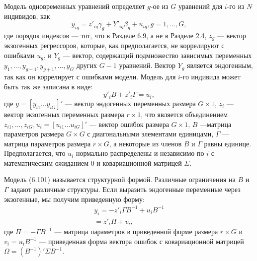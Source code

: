 Модель одновременных уравнений определяет $g$-ое из $G$ уравнений для $i$-го из $N$ индивидов, как
\begin{equation}
y_{ig}=z'_{ig} \gamma_g + Y'_{ig} \beta_g + u_{ig}, g=1, \dots, G,
\end{equation}
где порядок индексов --- тот, что в Разделе 6.9, а не в Разделе 2.4, $z_g$ --- вектор экзогенных регрессоров, которые, как предполагается, не коррелируют с ошибками $u_g$, и $Y_g$ --- вектор, содержащий подмножество зависимых переменных $y_1, \dots, y_{g-1}, y_{g+1}, \dots, y_G$ других $G-1$ уравнений. Вектор $Y_g$ является эндогенным, так как он коррелирует с ошибками модели. Модель для $i$-го индивида может быть так же записана в виде:
\begin{equation}
y'_i B + z'_i \Gamma =u_i,
\end{equation}
где $y=[y_{i1} \dots y_{iG}]'$ --- вектор эндогенных переменных размера $G \times 1$, $z_i$ --- вектор экзогенных переменных размера $r \times 1$, что является объединением $z_{i1}, \dots, z_{iG}, u_i=[u_{i1} \dots u_{iG}]'$ --- вектор ошибок размера $G \times 1$, $B$ ---матрица параметров размера $G \times G$ с диагональными элементами единицами, $\Gamma$ --- матрица параметров размера $r \times G$, а некоторые из членов $B$ и $\Gamma$ равны единице. Предполагается, что $u_i$ нормально распределены и независимо  по $i$ с математическим ожиданием $0$ и ковариационной матрицей $\Sigma$.

Модель (6.101) называется структурной формой.  Различные ограничения на $B$ и $\Gamma$ задают различные структуры. Если выразить эндогенные переменные через экзогенные, мы получим приведенную форму:
\begin{equation}
\begin{split}
y_i=-z'_i \Gamma B^{-1} + u_i  B^{-1} \\
= z'_i \Pi+ v_i,
\end{split}
\end{equation}
где $\Pi=-\Gamma B^{-1}$ --- матрица параметров в приведенной форме размера $r \times G$ и $ v_i=u_i B^{-1}$ --- приведенная форма вектора ошибок с ковариационной матрицей $\Omega=(B^{-1})' \Sigma B^{-1}$.

